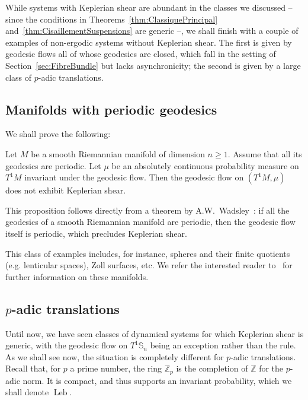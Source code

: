 \documentclass[AHL,Unicode,longabstracts]{cedram}
\DeclareMathOperator{\Leb}{Leb}
\newcommand{\Z}{\mathbb{Z}}
\newcommand{\Sbb}{\mathbb{S}}
\begin{document}
While systems with Keplerian shear are abundant in the classes we discussed -- since the conditions in Theorems~\ref{thm:ClassiquePrincipal} and~\ref{thm:CisaillementSuspensions} are generic --, we shall finish with a couple of examples of non-ergodic systems without Keplerian shear. The first is given by geodesic flows all of whose geodesics are closed, which fall in the setting of Section~\ref{sec:FibreBundle} but lacks asynchronicity; the second is given by a large class of $p$-adic translations.


\subsection{Manifolds with periodic geodesics}\label{subsec:FlotTS}

We shall prove the following:


\begin{prop}
Let $M$ be a smooth Riemannian manifold of dimension $n \geq 1$. Assume that all its geodesics are periodic. Let $\mu$ be an absolutely continuous probability measure on $T^1 M$ invariant under the geodesic flow. Then the geodesic flow on $(T^1 M, \mu)$ does not exhibit Keplerian shear.
\end{prop}


This proposition follows directly from a theorem by A.W.~Wadsley~\cite{Wadsley:1975}: if all the geodesics of a smooth Riemannian manifold are periodic, then the geodesic flow itself is periodic, which precludes Keplerian shear.


This class of examples includes, for instance, spheres and their finite quotients (e.g. lenticular spaces), Zoll surfaces, etc. We refer the interested reader to~\cite[Chapter~7]{Besse:1978} for further information on these manifolds.



\subsection{\texorpdfstring{$p$}{p}-adic translations}\label{subsec:PAdique}

Until now, we have seen classes of dynamical systems for which Keplerian shear is generic, with the geodesic flow on $T^1 \Sbb_n$ being an exception rather than the rule. As we shall see now, the situation is completely different for $p$-adic translations. Recall that, for $p$ a prime number, the ring $\Z_p$ is the completion of $\Z$ for the $p$-adic norm. It is compact, and thus supports an invariant probability, which we shall denote $\Leb$.
\end{document}
